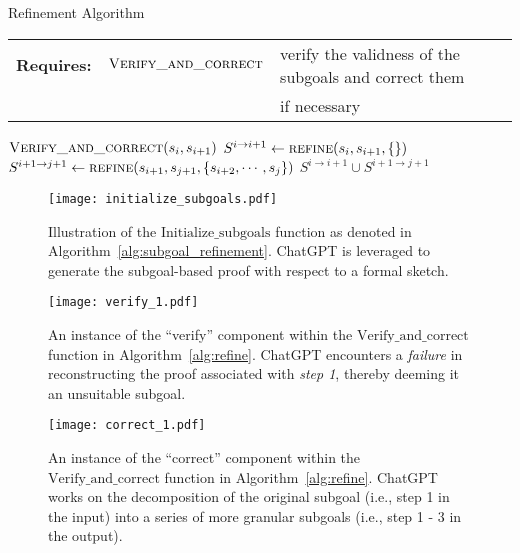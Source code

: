 \documentclass{article}
\begin{document}
\begin{algorithm}[]
\caption{Refinement Algorithm}
    \label{alg:refine}
\begin{tabular}{ l c l }
    \textbf{Requires: }
    & $\Call{Verify\_and\_correct}{}$ & verify the validness of the subgoals and correct them \\
    & & if necessary \\
\end{tabular}
\begin{algorithmic}
            \Return $\Call{Verify\_and\_correct}{s_i, s_{i+1}}$
        \EndIf
        \State $S^{i\rightarrow i+1}\gets \Call{refine}{s_i, s_{i+1}, \{\}}$
        \State $S^{i+1\rightarrow j+1}\gets \Call{refine}{s_{i+1},s_{j+1},\{s_{i+2}, \cdots, s_{j}\}}$
        \State \Return $S^{i\rightarrow i+1} \cup S^{i+1\rightarrow j+1}$
    \EndFunction
\end{algorithmic}
\end{algorithm}

\clearpage
\begin{figure*}
    \centering
    \texttt{[image: initialize\_subgoals.pdf]}
    \caption{Illustration of the $\mathrm{Initialize\_subgoals}$ function as denoted in Algorithm~\ref{alg:subgoal_refinement}. ChatGPT is leveraged to generate the subgoal-based proof with respect to a formal sketch.}
    \label{fig:initialize_subgoals}
\end{figure*}

\begin{figure*}
    \centering
    \texttt{[image: verify\_1.pdf]}
    \caption{An instance of the ``verify'' component within the $\mathrm{Verify\_and\_correct}$ function in Algorithm~\ref{alg:refine}. ChatGPT encounters a \emph{failure} in reconstructing the proof associated with \emph{step 1}, thereby deeming it an unsuitable subgoal.}
    \label{fig:verify_1}
\end{figure*}

\begin{figure*}
    \centering
    \texttt{[image: correct\_1.pdf]}
    \caption{An instance of the ``correct'' component within the $\mathrm{Verify\_and\_correct}$ function in Algorithm~\ref{alg:refine}. ChatGPT works on the decomposition of the original subgoal (i.e., step 1 in the input) into a series of more granular subgoals (i.e., step 1 - 3 in the output).}
    \label{fig:correct_1}
\end{figure*}
\end{document}
